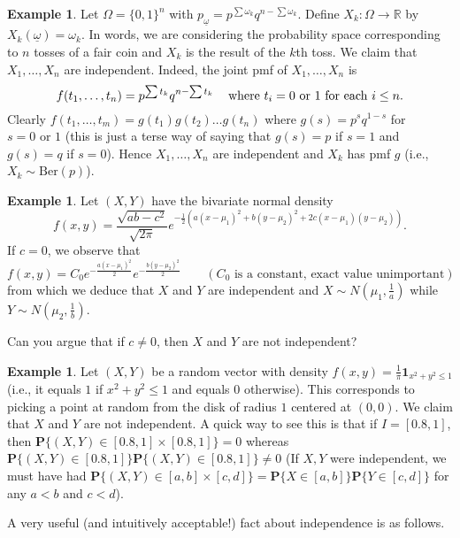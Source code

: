 \documentclass[preprint,  11pt]{amsart}
\def\ome{\omega}
\theoremstyle{plain} %
\theoremstyle{definition} %
\newtheorem{example}[theorem]{Example}
\begin{document}
\begin{example} Let $\Omega=\{0,1\}^{n}$ with $p_{\underline{\ome}}=p^{\sum \omega_{k}}q^{n-\sum \omega_{k}}$. Define $X_{k}:\Omega\rightarrow \mathbb{R}$ by $X_{k}(\underline{\ome})=\omega_{k}$. In words, we are considering the probability space corresponding to $n$ tosses of a fair coin and $X_{k}$ is the result of the $k$th toss. We claim that $X_{1},\ldots ,X_{n}$ are independent. Indeed, the joint pmf of $X_{1},\ldots ,X_{n}$ is 
$$
f(t_{1},\ldots ,t_{n})=p^{\sum t_{k}}q^{n-\sum t_{k}} \hspace{3mm} \mbox{ where }t_{i}=0\mbox{ or }1 \mbox{ for each }i\le n.
$$
Clearly $f(t_{1},\ldots ,t_{m})=g(t_{1})g(t_{2})\ldots g(t_{n})$ where $g(s)=p^{s}q^{1-s}$ for $s=0\mbox{ or }1$ (this is just a terse way of saying that $g(s)=p$ if $s=1$ and $g(s)=q$ if $s=0$). Hence $X_{1},\ldots ,X_{n}$ are independent and $X_{k}$ has pmf $g$ (i.e., $X_{k}\sim \mbox{Ber}(p)$).
\end{example}

\begin{example} Let $(X,Y)$ have the bivariate normal density 
$$
f(x,y)=\frac{\sqrt{ab-c^{2}}}{\sqrt{2\pi}}e^{-\frac{1}{2}(a(x-\mu_{1})^{2}+b(y-\mu_{2})^{2}+2c(x-\mu_{1})(y-\mu_{2}))}.
$$
If $c=0$, we observe that 
$$
f(x,y) = C_{0} e^{-\frac{a(x-\mu_{1})^{2}}{2}}e^{-\frac{b(y-\mu_{2})^{2}}{2}} \qquad (C_{0}\mbox{ is a constant, exact value unimportant})
$$
from which we deduce that $X$ and $Y$ are independent and $X\sim N(\mu_{1},\frac{1}{a})$ while $Y\sim N(\mu_{2},\frac{1}{b})$.

Can you argue that if $c\not=0$, then $X$ and $Y$ are not independent?
\end{example}


\begin{example} Let $(X,Y)$ be a random vector with density $f(x,y)=\frac{1}{\pi}{\mathbf 1}_{x^{2}+y^{2}\le 1}$ (i.e., it equals $1$ if $x^{2}+y^{2}\le 1$ and equals  $0$ otherwise). This corresponds to picking a point at random from the disk of radius $1$ centered at $(0,0)$. We claim that $X$ and $Y$ are not independent. A quick way to see this is that if $I=[0.8,1]$, then $\mathbf{P}\{(X,Y)\in [0.8,1]\times [0.8,1]\}=0$ whereas $\mathbf{P}\{(X,Y)\in [0.8,1]\}\mathbf{P}\{(X,Y)\in [0.8,1]\}\not= 0$ (If $X,Y$ were independent, we must have had $\mathbf{P}\{(X,Y)\in [a,b]\times [c,d]\}=\mathbf{P}\{X\in [a,b]\}\mathbf{P}\{Y\in [c,d]\}$ for any $a<b$ and $c<d$).
\end{example}

A very useful (and intuitively acceptable!) fact about independence is as follows.
\end{document}
